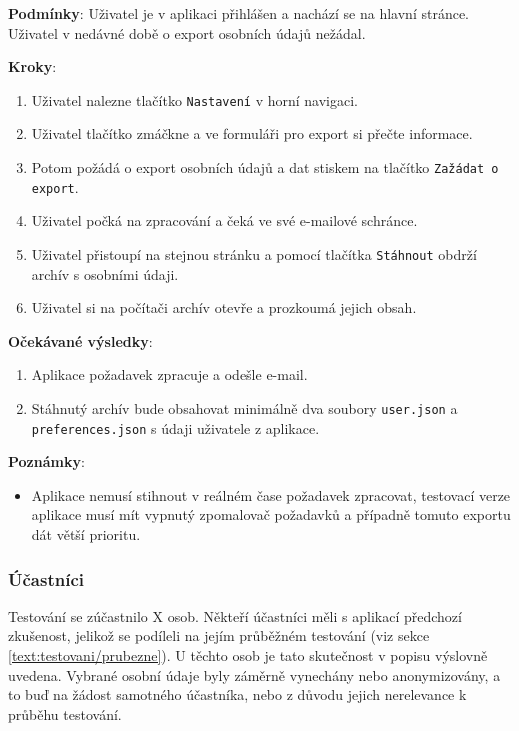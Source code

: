 \textbf{Podmínky}: Uživatel je v aplikaci přihlášen a nachází se na hlavní stránce. Uživatel v nedávné době o export osobních údajů nežádal.

\textbf{Kroky}:

\begin{enumerate}[leftmargin=1.4cm]
    \item Uživatel nalezne tlačítko \verb|Nastavení| v horní navigaci.
    \item Uživatel tlačítko zmáčkne a ve formuláři pro export si přečte informace.
    \item Potom požádá o export osobních údajů a dat stiskem na tlačítko \verb|Zažádat o export|.
    \item Uživatel počká na zpracování a čeká ve své e-mailové schránce.
    \item Uživatel přistoupí na stejnou stránku a pomocí tlačítka \verb|Stáhnout| obdrží archív s osobními údaji.
    \item Uživatel si na počítači archív otevře a prozkoumá jejich obsah.
\end{enumerate}

\textbf{Očekávané výsledky}:

\begin{enumerate}[leftmargin=1.4cm]
    \item Aplikace požadavek zpracuje a odešle e-mail.
    \item Stáhnutý archív bude obsahovat minimálně dva soubory  \verb|user.json| a \verb|preferences.json| s údaji uživatele z aplikace.
\end{enumerate}

\textbf{Poznámky}:

\begin{itemize}[leftmargin=1.4cm]
    \item Aplikace nemusí stihnout v reálném čase požadavek zpracovat, testovací verze aplikace musí mít vypnutý zpomalovač požadavků a případně tomuto exportu dát větší prioritu.
\end{itemize}



\subsubsection{Účastníci}

Testování se zúčastnilo X osob. 
Někteří účastníci měli s aplikací předchozí zkušenost, jelikož se podíleli na jejím průběžném testování (viz sekce \ref{text:testovani/prubezne}). 
U těchto osob je tato skutečnost v popisu výslovně uvedena. 
Vybrané osobní údaje byly záměrně vynechány nebo anonymizovány, a to buď na žádost samotného účastníka, nebo z důvodu jejich nerelevance k průběhu testování.

